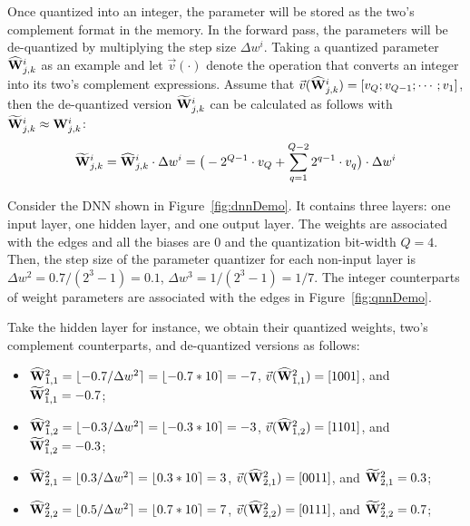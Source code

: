 Once quantized into an integer, the parameter will be stored as the two's complement format in the memory. In the forward pass, the parameters will be de-quantized by multiplying the step size $\Delta w^i$. Taking a quantized parameter $\widehat{{\mathbf{W}}}^{i}_{j,k}$ as an example and let $\vec{v}(\cdot)$ denote the operation that converts an integer into its two's complement expressions. Assume that $\vec{v}(\widehat{{\mathbf{W}}}^i_{j,k})=[v_{Q};v_{Q-1};\cdots;v_1]$, then the de-quantized version $\widetilde{{\mathbf{W}}}^i_{j,k}$ can be calculated as follows with $\widetilde{{\mathbf{W}}}^i_{j,k}\approx {\mathbf{W}}^i_{j,k}$:
\[
\widetilde{{\mathbf{W}}}^i_{j,k}=\widehat{{\mathbf{W}}}^i_{j,k} \cdot \Delta w^i =\big( -2^{Q-1}\cdot v_{Q}+\sum_{q=1}^{Q-2} 2^{q-1}\cdot v_{q} \big) \cdot \Delta w^i
\]

\begin{example}\label{eg:dnnDemo}
    Consider the DNN shown in Figure~\ref{fig:dnnDemo}. It contains three layers: one input layer, one hidden layer, and one output layer. The weights are associated with the edges and all the biases are 0 and the quantization bit-width $Q=4$. Then, the step size of the parameter quantizer for each non-input layer is $\Delta w^2 = 0.7/(2^3-1) = 0.1$, $\Delta w^3 = 1/(2^3-1) = 1/7$. 
    The integer counterparts of weight parameters are associated with the edges in Figure~\ref{fig:qnnDemo}. 
    
    Take the hidden layer for instance, we obtain their quantized weights, two's complement counterparts, and de-quantized versions as follows: 
    \begin{itemize}
        \item $\widehat{{\mathbf{W}}}^2_{1,1}=\lfloor -0.7/\Delta w^2 \rceil=\lfloor -0.7*10 \rceil =-7$, $\vec{v}(\widehat{{\mathbf{W}}}^{2}_{1,1})=[1001]$, and $\widetilde{{\mathbf{W}}}^2_{1,1}=-0.7$;
        
        \item $\widehat{{\mathbf{W}}}^2_{1,2}=\lfloor -0.3/\Delta w^2  \rceil=\lfloor -0.3*10  \rceil=-3$, $\vec{v}(\widehat{{\mathbf{W}}}^{2}_{1,2})=[1101]$, and  $\widetilde{{\mathbf{W}}}^2_{1,2}=-0.3$;

        \item $\widehat{{\mathbf{W}}}^2_{2,1}=\lfloor 0.3/\Delta w^2  \rceil =\lfloor 0.3*10 \rceil =3$, $\vec{v}(\widehat{{\mathbf{W}}}^{2}_{2,1})=[0011]$, and $\widetilde{{\mathbf{W}}}^2_{2,1}=0.3$;
        
        \item $\widehat{{\mathbf{W}}}^2_{2,2}=\lfloor 0.5/\Delta w^2 \rceil=\lfloor 0.7*10 \rceil =7$, $\vec{v}(\widehat{{\mathbf{W}}}^{2}_{2,2})=[0111]$, and $\widetilde{{\mathbf{W}}}^2_{2,2}=0.7$;
    \end{itemize}
    

\end{example}
